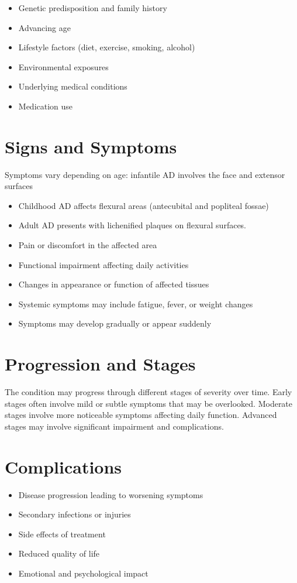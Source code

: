 \begin{itemize}[noitemsep]
  \item Genetic predisposition and family history
  \item Advancing age
  \item Lifestyle factors (diet, exercise, smoking, alcohol)
  \item Environmental exposures
  \item Underlying medical conditions
  \item Medication use
\end{itemize}
\section{Signs and Symptoms}
Symptoms vary depending on age: infantile AD involves the face and extensor surfaces

\begin{itemize}[noitemsep]
  \item Childhood AD affects flexural areas (antecubital and popliteal fossae)
  \item Adult AD presents with lichenified plaques on flexural surfaces.
  \item Pain or discomfort in the affected area
  \item Functional impairment affecting daily activities
  \item Changes in appearance or function of affected tissues
  \item Systemic symptoms may include fatigue, fever, or weight changes
  \item Symptoms may develop gradually or appear suddenly
\end{itemize}
\section{Progression and Stages}
The condition may progress through different stages of severity over time. Early stages often involve mild or subtle symptoms that may be overlooked. Moderate stages involve more noticeable symptoms affecting daily function. Advanced stages may involve significant impairment and complications.
\section{Complications}
\begin{itemize}[noitemsep]
  \item Disease progression leading to worsening symptoms
  \item Secondary infections or injuries
  \item Side effects of treatment
  \item Reduced quality of life
  \item Emotional and psychological impact
\end{itemize}
